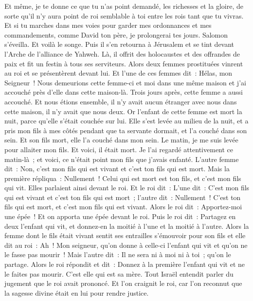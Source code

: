 \begin{multicols}{2}
Et même, je te donne ce que tu n'as point demandé, les richesses et la gloire, de sorte qu'il n'y aura point de roi semblable à toi entre les rois tant que tu vivras.
Et si tu marches dans mes voies pour garder mes ordonnances et mes commandements, comme David ton père, je prolongerai tes jours.
Salomon s'éveilla. Et voilà le songe. Puis il s'en retourna à Jérusalem et se tint devant l'Arche de l'alliance de Yahweh. Là, il offrit des holocaustes et des offrandes de paix et fit un festin à tous ses serviteurs.
Alors deux femmes prostituées vinrent au roi et se présentèrent devant lui.
Et l'une de ces femmes dit~: Hélas, mon Seigneur~! Nous demeurions cette femme-ci et moi dans une même maison et j'ai accouché près d'elle dans cette maison-là.
Trois jours après, cette femme a aussi accouché. Et nous étions ensemble, il n'y avait aucun étranger avec nous dans cette maison, il n'y avait que nous deux.
Or l'enfant de cette femme est mort la nuit, parce qu'elle s'était couchée sur lui.
Elle s'est levée au milieu de la nuit, et a pris mon fils à mes côtés pendant que ta servante dormait, et l'a couché dans son sein. Et son fils mort, elle l'a couché dans mon sein.
Le matin, je me suis levée pour allaiter mon fils. Et voici, il était mort. Je l'ai regardé attentivement ce matin-là~; et voici, ce n'était point mon fils que j'avais enfanté.
L'autre femme dit~: Non, c'est mon fils qui est vivant et c'est ton fils qui est mort. Mais la première répliqua~: Nullement~! Celui qui est mort est ton fils, et c'est mon fils qui vit. Elles parlaient ainsi devant le roi.
Et le roi dit~: L'une dit~: C'est mon fils qui est vivant et c'est ton fils qui est mort~; l'autre dit~: Nullement~! C'est ton fils qui est mort, et c'est mon fils qui est vivant.
Alors le roi dit~: Apportez-moi une épée~! Et on apporta une épée devant le roi.
Puis le roi dit~: Partagez en deux l'enfant qui vit, et donnez-en la moitié à l'une et la moitié à l'autre.
Alors la femme dont le fils était vivant sentit ses entrailles s'émouvoir pour son fils et elle dit au roi~: Ah~! Mon seigneur, qu'on donne à celle-ci l'enfant qui vit et qu'on ne le fasse pas mourir~! Mais l'autre dit~: Il ne sera ni à moi ni à toi~; qu'on le partage.
Alors le roi répondit et dit~: Donnez à la première l'enfant qui vit et ne le faites pas mourir. C'est elle qui est sa mère.
Tout Israël entendit parler du jugement que le roi avait prononcé. Et l'on craignit le roi, car l'on reconnut que la sagesse divine était en lui pour rendre justice.

\end{multicols}
